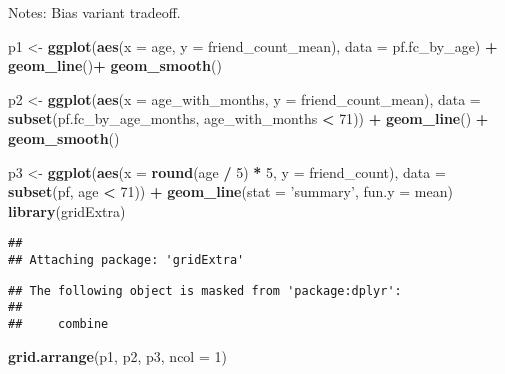 \documentclass[]{article}
\newenvironment{Shaded}{\begin{snugshade}}{\end{snugshade}}
\newcommand{\KeywordTok}[1]{\textcolor[rgb]{0.13,0.29,0.53}{\textbf{#1}}}
\newcommand{\DataTypeTok}[1]{\textcolor[rgb]{0.13,0.29,0.53}{#1}}
\newcommand{\DecValTok}[1]{\textcolor[rgb]{0.00,0.00,0.81}{#1}}
\newcommand{\StringTok}[1]{\textcolor[rgb]{0.31,0.60,0.02}{#1}}
\newcommand{\OperatorTok}[1]{\textcolor[rgb]{0.81,0.36,0.00}{\textbf{#1}}}
\newcommand{\NormalTok}[1]{#1}
\begin{document}
Notes: Bias variant tradeoff.

\begin{Shaded}
\begin{Highlighting}[]
\NormalTok{p1 <-}\StringTok{ }\KeywordTok{ggplot}\NormalTok{(}\KeywordTok{aes}\NormalTok{(}\DataTypeTok{x =}\NormalTok{ age, }\DataTypeTok{y =}\NormalTok{ friend_count_mean),}
       \DataTypeTok{data =}\NormalTok{ pf.fc_by_age) }\OperatorTok{+}
\StringTok{  }\KeywordTok{geom_line}\NormalTok{()}\OperatorTok{+}
\StringTok{  }\KeywordTok{geom_smooth}\NormalTok{()}

\NormalTok{p2 <-}\StringTok{ }\KeywordTok{ggplot}\NormalTok{(}\KeywordTok{aes}\NormalTok{(}\DataTypeTok{x =}\NormalTok{ age_with_months, }\DataTypeTok{y =}\NormalTok{ friend_count_mean),}
       \DataTypeTok{data =} \KeywordTok{subset}\NormalTok{(pf.fc_by_age_months, age_with_months }\OperatorTok{<}\StringTok{ }\DecValTok{71}\NormalTok{)) }\OperatorTok{+}
\StringTok{        }\KeywordTok{geom_line}\NormalTok{() }\OperatorTok{+}
\StringTok{        }\KeywordTok{geom_smooth}\NormalTok{()}

\NormalTok{p3 <-}\StringTok{ }\KeywordTok{ggplot}\NormalTok{(}\KeywordTok{aes}\NormalTok{(}\DataTypeTok{x =} \KeywordTok{round}\NormalTok{(age }\OperatorTok{/}\StringTok{ }\DecValTok{5}\NormalTok{) }\OperatorTok{*}\StringTok{ }\DecValTok{5}\NormalTok{, }\DataTypeTok{y =}\NormalTok{ friend_count),}
             \DataTypeTok{data =} \KeywordTok{subset}\NormalTok{(pf, age }\OperatorTok{<}\StringTok{ }\DecValTok{71}\NormalTok{)) }\OperatorTok{+}
\StringTok{  }\KeywordTok{geom_line}\NormalTok{(}\DataTypeTok{stat =} \StringTok{'summary'}\NormalTok{, }\DataTypeTok{fun.y =}\NormalTok{ mean)}
\KeywordTok{library}\NormalTok{(gridExtra)}
\end{Highlighting}
\end{Shaded}

\begin{verbatim}
## 
## Attaching package: 'gridExtra'
\end{verbatim}

\begin{verbatim}
## The following object is masked from 'package:dplyr':
## 
##     combine
\end{verbatim}

\begin{Shaded}
\begin{Highlighting}[]
\KeywordTok{grid.arrange}\NormalTok{(p1, p2, p3, }\DataTypeTok{ncol =}  \DecValTok{1}\NormalTok{)}
\end{Highlighting}
\end{Shaded}
\end{document}
